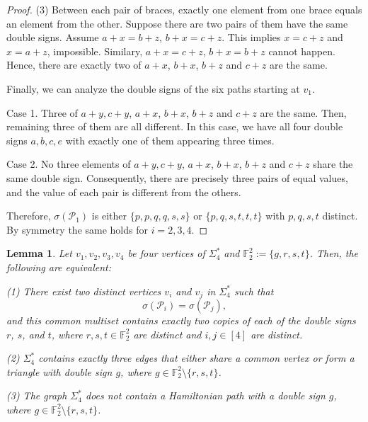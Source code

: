 \documentclass[12pt]{amsart}
\theoremstyle{plain}
\newtheorem{lemma}[theorem]{Lemma}
\theoremstyle{definition}%
\begin{document}
\begin{proof}
(3) Between each pair of braces, exactly one element from one brace equals an element from the other.
 Suppose there are two pairs of them have the same double signs. Assume 
     $a+x=b+z$, $b+x=c+z$. This implies $x=c+z$ and $x=a+z$, impossible. Similary, $a+x=c+z$, $b+x=b+z$ cannot happen. Hence, there are exactly two of $a+x$, $b+x$, $b+z$ and $c+z$ are the same. 

\vspace{0.5cm}

Finally, we can analyze the double signs of the six paths starting at $v_1$.

Case 1. Three of $a+y,c+y$, $a+x$, $b+x$, $b+z$ and $c+z$ are the same. Then, remaining three of them are all different. In this case, we have all four double signs $a,b,c,e$ with exactly one of them appearing three times. 

Case 2. No three elements of $a+y,c+y$, $a+x$, $b+x$, $b+z$ and $c+z$  share the same double sign. Consequently, there are
precisely three pairs of equal values, and the value of each pair is
different from the others.

\vspace{0.5cm}

Therefore, \(\sigma(\mathscr P_1)\) is either \(\{p,p,q,q,s,s\}\) or
\(\{p,q,s,t,t,t\}\) with \(p,q,s,t\) distinct. By symmetry the same holds for
\(i=2,3,4\).
\end{proof}











\begin{lemma}\label{same}
Let $v_1,v_2,v_3,v_4$ be four vertices of   $\Sigma_4^*$ and $\mathbb{F}_2^2:=\{g,r,s,t\}$.
 Then, the following are equivalent:
\vspace{1cm}

(1) There exist two distinct vertices \(v_i\) and \(v_j\) in \(\Sigma_4^*\) such that
\[
\sigma(\mathscr{P}_i) = \sigma(\mathscr{P}_j),
\]
and this common multiset contains exactly two copies of each of the double signs \(r\), \(s\), and \(t\), where  $r,s,t\in \mathbb{F}_2^2$ are distinct and  $i,j\in [4]$ are distinct.

(2) \(\Sigma_4^*\) contains exactly three edges that either share a common vertex or form a triangle with double sign \(g\), where $g \in \mathbb{F}_2^2 \setminus \{r,s,t\}$.

(3) The graph $\Sigma_4^*$ does not contain a Hamiltonian path with a double sign $g$, where $g \in \mathbb{F}_2^2 \setminus \{r,s,t\}$.

\end{lemma}
\end{document}
